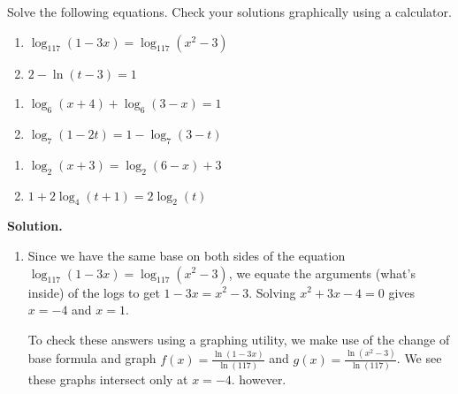 \documentclass{ximera}
\begin{document}
\smallskip

\begin{ex}  \label{LogEqnsEx1} Solve the following equations.  Check your solutions graphically using a calculator.

\begin{multicols}{2}
\begin{enumerate}

\item  $\log_{117}(1-3x) = \log_{117}\left(x^2-3\right)$

\item  $2 - \ln(t-3) = 1$

\setcounter{HW}{\value{enumi}}
\end{enumerate}
\end{multicols}

\begin{multicols}{2}
\begin{enumerate}
\setcounter{enumi}{\value{HW}}

\item  $\log_{6}(x+4) + \log_{6}(3-x) = 1$

\item  $\log_{7}(1-2t) = 1 - \log_{7}(3-t)$
\setcounter{HW}{\value{enumi}}
\end{enumerate}
\end{multicols}

\begin{multicols}{2}
\begin{enumerate}
\setcounter{enumi}{\value{HW}}

\item  $\log_{2}(x+3) = \log_{2}(6-x)+3$

\item  $1 + 2 \log_{4}(t+1) = 2 \log_{2}(t)$

\end{enumerate}
\end{multicols}

{\bf Solution.}

\begin{enumerate}

\item  Since we have the same base on both sides of the equation $\log_{117}(1-3x) = \log_{117}\left(x^2-3\right)$, we equate the arguments (what's inside) of the logs to get $1-3x = x^2-3$.  Solving $x^2+3x-4 = 0$ gives $x=-4$ and $x=1$. 

\smallskip

To check these answers using a graphing utility,  we make use of the change of base formula and graph $f(x) = \frac{\ln(1-3x)}{\ln(117)}$ and $g(x) = \frac{\ln\left(x^2-3\right)}{\ln(117)}$.  We see these graphs intersect only at $x=-4$. however.  


\end{enumerate}
\end{ex}
\end{document}
